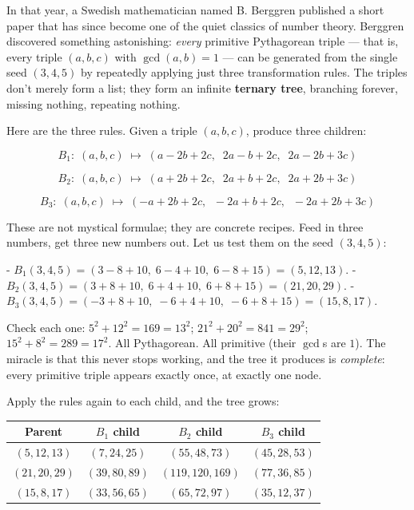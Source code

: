 \documentclass[12pt, letterpaper, openany]{book}
\theoremstyle{definition}
\theoremstyle{remark}
\begin{document}
In that year, a Swedish mathematician named B. Berggren published a short paper that has since become one of the quiet classics of number theory. Berggren discovered something astonishing: \textit{every} primitive Pythagorean triple --- that is, every triple $(a, b, c)$ with $\gcd(a, b) = 1$ --- can be generated from the single seed $(3, 4, 5)$ by repeatedly applying just three transformation rules. The triples don't merely form a list; they form an infinite \textbf{ternary tree}, branching forever, missing nothing, repeating nothing.

Here are the three rules. Given a triple $(a, b, c)$, produce three children:

\[
B_1:\; (a, b, c) \;\longmapsto\; (a - 2b + 2c,\;\; 2a - b + 2c,\;\; 2a - 2b + 3c)
\]

\[
B_2:\; (a, b, c) \;\longmapsto\; (a + 2b + 2c,\;\; 2a + b + 2c,\;\; 2a + 2b + 3c)
\]

\[
B_3:\; (a, b, c) \;\longmapsto\; (-a + 2b + 2c,\;\; -2a + b + 2c,\;\; -2a + 2b + 3c)
\]

These are not mystical formulae; they are concrete recipes. Feed in three numbers, get three new numbers out. Let us test them on the seed $(3, 4, 5)$:

- $B_1(3,4,5) = (3 - 8 + 10,\; 6 - 4 + 10,\; 6 - 8 + 15) = (5, 12, 13)$.
- $B_2(3,4,5) = (3 + 8 + 10,\; 6 + 4 + 10,\; 6 + 8 + 15) = (21, 20, 29)$.
- $B_3(3,4,5) = (-3 + 8 + 10,\; -6 + 4 + 10,\; -6 + 8 + 15) = (15, 8, 17)$.

Check each one: $5^2 + 12^2 = 169 = 13^2$; $21^2 + 20^2 = 841 = 29^2$; $15^2 + 8^2 = 289 = 17^2$. All Pythagorean. All primitive (their $\gcd$s are $1$). The miracle is that this never stops working, and the tree it produces is \textit{complete}: every primitive triple appears exactly once, at exactly one node.

Apply the rules again to each child, and the tree grows:


\begin{center}
\begin{tabular}{|c|c|c|c|}
\hline
Parent & $B_1$ child & $B_2$ child & $B_3$ child \\
\hline
$(5,12,13)$ & $(7,24,25)$ & $(55,48,73)$ & $(45,28,53)$ \\
$(21,20,29)$ & $(39,80,89)$ & $(119,120,169)$ & $(77,36,85)$ \\
$(15,8,17)$ & $(33,56,65)$ & $(65,72,97)$ & $(35,12,37)$ \\
\hline
\end{tabular}
\end{center}
\end{document}
